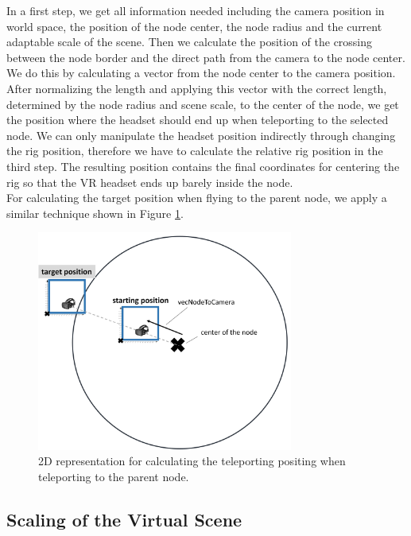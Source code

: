 In a first step, we get all information needed including the camera position in world space, the position of the node center, the node radius and the current adaptable scale of the scene.
Then we calculate the position of the crossing between the node border and the direct path from the camera to the node center. We do this by calculating a vector from the node center to the camera position. After normalizing the length and applying this vector with the correct length, determined by the node radius and scene scale, to the center of the node, we get the position where the headset should end up when teleporting to the selected node.
We can only manipulate the headset position indirectly through changing the rig position, therefore we have to calculate the relative rig position in the third step. 
The resulting position contains the final coordinates for centering the rig so that the VR headset ends up barely inside the node.\\
For calculating the target position when flying to the parent node, we apply a similar technique shown in Figure \ref{fig:vrFlyToParentNode}.

\begin{figure}[h]
    \centering
    \includegraphics[width=0.75\textwidth]{graphics/flyToParentNode.jpg}
    \caption{2D representation for calculating the teleporting positing when teleporting to the parent node.} 
    \label{fig:vrFlyToParentNode} 
\end{figure}

\pagebreak

\subsection{Scaling of the Virtual Scene}
\label{sec:scaling}

